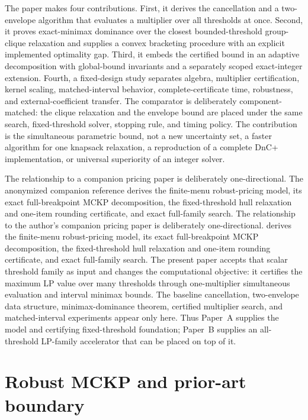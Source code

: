 \documentclass[11pt]{article}
\theoremstyle{plain}
\theoremstyle{definition}
\theoremstyle{remark}
\begin{document}
The paper makes four contributions.  First, it derives the cancellation and a two-envelope algorithm that evaluates a multiplier over all thresholds at once.  Second, it proves exact-minimax dominance over the closest bounded-threshold group-clique relaxation and supplies a convex bracketing procedure with an explicit implemented optimality gap.  Third, it embeds the certified bound in an adaptive decomposition with global-bound invariants and a separately scoped exact-integer extension.  Fourth, a fixed-design study separates algebra, multiplier certification, kernel scaling, matched-interval behavior, complete-certificate time, robustness, and external-coefficient transfer.  The comparator is deliberately component-matched: the clique relaxation and the envelope bound are placed under the same search, fixed-threshold solver, stopping rule, and timing policy.  The contribution is the simultaneous parametric bound, not a new uncertainty set, a faster algorithm for one knapsack relaxation, a reproduction of a complete DnC+ implementation, or universal superiority of an integer solver.

\ifblind
The relationship to a companion pricing paper is deliberately one-directional.  The anonymized companion reference derives the finite-menu robust-pricing model, its exact full-breakpoint MCKP decomposition, the fixed-threshold hull relaxation and one-item rounding certificate, and exact full-family search.
\else
The relationship to the author's companion pricing paper is deliberately one-directional.  \citet{Shao2026PaperA} derives the finite-menu robust-pricing model, its exact full-breakpoint MCKP decomposition, the fixed-threshold hull relaxation and one-item rounding certificate, and exact full-family search.
\fi
The present paper accepts that scalar threshold family as input and changes the computational objective: it certifies the maximum LP value over many thresholds through one-multiplier simultaneous evaluation and interval minimax bounds.  The baseline cancellation, two-envelope data structure, minimax-dominance theorem, certified multiplier search, and matched-interval experiments appear only here.  Thus Paper~A supplies the model and certifying fixed-threshold foundation; Paper~B supplies an all-threshold LP-family accelerator that can be placed on top of it.

\section{Robust MCKP and prior-art boundary}\label{sec:problem}
\end{document}
